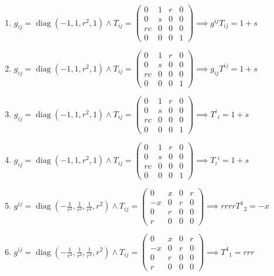 \documentclass[11pt,a4paper]{article}
\begin{document}
\begin{enumerate}
\item $\displaystyle g_{ij} = \operatorname{diag}(-1, 1, r^{2}, 1) \land T_{ij} = \begin{pmatrix} 0 & 1 & r & 0 \\ 0 & s & 0 & 0 \\ r c & 0 & 0 & 0 \\ 0 & 0 & 0 & 1 \end{pmatrix} \implies g^{ij} T_{ij} = 1 + s$
\item $\displaystyle g_{ij} = \operatorname{diag}(-1, 1, r^{2}, 1) \land T_{ij} = \begin{pmatrix} 0 & 1 & r & 0 \\ 0 & s & 0 & 0 \\ r c & 0 & 0 & 0 \\ 0 & 0 & 0 & 1 \end{pmatrix} \implies g_{ij} T^{ij} = 1 + s$
\item $\displaystyle g_{ij} = \operatorname{diag}(-1, 1, r^{2}, 1) \land T_{ij} = \begin{pmatrix} 0 & 1 & r & 0 \\ 0 & s & 0 & 0 \\ r c & 0 & 0 & 0 \\ 0 & 0 & 0 & 1 \end{pmatrix} \implies T^{i}{}_{i} = 1 + s$
\item $\displaystyle g_{ij} = \operatorname{diag}(-1, 1, r^{2}, 1) \land T_{ij} = \begin{pmatrix} 0 & 1 & r & 0 \\ 0 & s & 0 & 0 \\ r c & 0 & 0 & 0 \\ 0 & 0 & 0 & 1 \end{pmatrix} \implies T_{i}{}^{i} = 1 + s$
\item $\displaystyle g^{ij} = \operatorname{diag}(-\frac{1}{r^{4}}, \frac{1}{r^{4}}, \frac{1}{r^{4}}, r^{2}) \land T_{ij} = \begin{pmatrix} 0 & x & 0 & r \\ -x & 0 & r & 0 \\ 0 & r & 0 & 0 \\ r & 0 & 0 & 0 \end{pmatrix} \implies r r r r T^{1}{}_{2} = -x$
\item $\displaystyle g^{ij} = \operatorname{diag}(-\frac{1}{r^{4}}, \frac{1}{r^{4}}, \frac{1}{r^{4}}, r^{2}) \land T_{ij} = \begin{pmatrix} 0 & x & 0 & r \\ -x & 0 & r & 0 \\ 0 & r & 0 & 0 \\ r & 0 & 0 & 0 \end{pmatrix} \implies T^{4}{}_{1} = r r r$

\end{enumerate}
\end{document}
